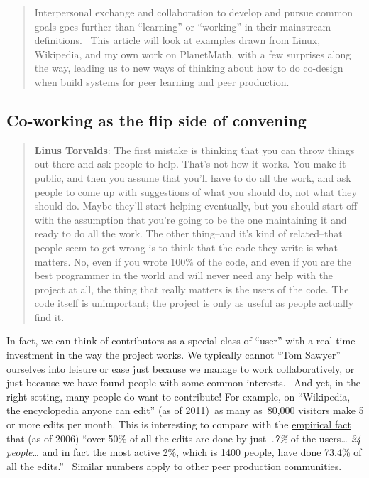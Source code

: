 
\begin{quote}
 Interpersonal exchange and
collaboration to develop and pursue common goals goes further than
``learning'' or ``working'' in their mainstream definitions. ~This
article will look at examples drawn from Linux, Wikipedia, and my own
work on PlanetMath, with a few surprises along the way, leading us to
new ways of thinking about how to do co-design when build systems for
peer learning and peer production.
\end{quote}

\subsection{Co-working as the flip side of convening}

\begin{quote}
\textbf{Linus Torvalds}: The first mistake is thinking that you can
throw things out there and ask people to help. That's not how it works.
You make it public, and then you assume that you'll have to do all the
work, and ask people to come up with suggestions of what you should do,
not what they should do. Maybe they'll start helping eventually, but you
should start off with the assumption that you're going to be the one
maintaining it and ready to do all the work. The other thing--and it's
kind of related--that people seem to get wrong is to think that the code
they write is what matters. No, even if you wrote 100\% of the code, and
even if you are the best programmer in the world and will never need any
help with the project at all, the thing that really matters is the users
of the code. The code itself is unimportant; the project is only as
useful as people actually find it.
\end{quote}

In fact, we can think of contributors as a special class of ``user''
with a real time investment in the way the project works. We typically
cannot ``Tom Sawyer'' ourselves into leisure or ease just because we
manage to work collaboratively, or just because we have found people
with some common interests.~ And yet, in the right setting, many people
do want to contribute! For example, on ``Wikipedia, the encyclopedia
anyone can edit'' (as of
2011)~\href{http://\%20http://www.readwriteweb.com/archives/wikipedias_goal_1_billion_monthly_visitors_by_2015.php}{as
many as}~80,000 visitors make 5 or more edits per month. This is interesting to compare with the
\href{http://www.aaronsw.com/weblog/whowriteswikipedia}{empirical fact}
that (as of 2006) ``over 50\% of all the edits are done by just~\emph{.7\%} of
the users\ldots{} \emph{24 people}\ldots{} and in fact the most active 2\%,
which is 1400 people, have done 73.4\% of all the edits.''~ Similar
numbers apply to other peer production communities.

